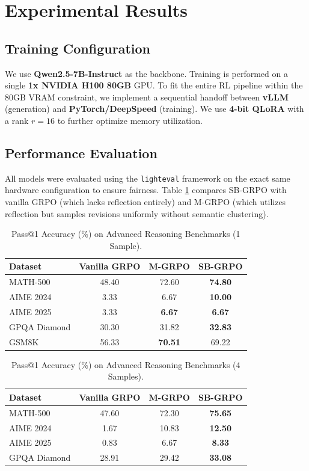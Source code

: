 \section{Experimental Results}

\subsection{Training Configuration}
We use \textbf{Qwen2.5-7B-Instruct} as the backbone. Training is performed on a single \textbf{1x NVIDIA H100 80GB} GPU. To fit the entire RL pipeline within the 80GB VRAM constraint, we implement a sequential handoff between \textbf{vLLM} (generation) and \textbf{PyTorch/DeepSpeed} (training). We use \textbf{4-bit QLoRA} with a rank $r=16$ to further optimize memory utilization.

\subsection{Performance Evaluation}
All models were evaluated using the \texttt{lighteval} framework on the exact same hardware configuration to ensure fairness. Table \ref{tab:main} compares SB-GRPO with vanilla GRPO (which lacks reflection entirely) and M-GRPO (which utilizes reflection but samples revisions uniformly without semantic clustering).

\begin{table}[ht]
\centering
\caption{Pass@1 Accuracy (\%) on Advanced Reasoning Benchmarks (1 Sample).}
\label{tab:main}
\begin{tabular}{lccc}
\toprule
Dataset & Vanilla GRPO & M-GRPO & \textbf{SB-GRPO} \\
\midrule
MATH-500      & 48.40 & 72.60 & \textbf{74.80} \\
AIME 2024     & 3.33  & 6.67  & \textbf{10.00} \\
AIME 2025     & 3.33  & \textbf{6.67}  & \textbf{6.67}  \\
GPQA Diamond  & 30.30 & 31.82 & \textbf{32.83} \\
GSM8K         & 56.33 & \textbf{70.51} & 69.22 \\
\bottomrule
\end{tabular}
\end{table}

\begin{table}[ht]
\centering
\caption{Pass@1 Accuracy (\%) on Advanced Reasoning Benchmarks (4 Samples).}
\label{tab:pass4}
\begin{tabular}{lccc}
\toprule
Dataset & Vanilla GRPO & M-GRPO & \textbf{SB-GRPO} \\
\midrule
MATH-500      & 47.60 & 72.30 & \textbf{75.65} \\
AIME 2024     & 1.67  & 10.83 & \textbf{12.50} \\
AIME 2025     & 0.83  & 6.67  & \textbf{8.33}  \\
GPQA Diamond  & 28.91 & 29.42 & \textbf{33.08} \\
\bottomrule
\end{tabular}
\end{table}


